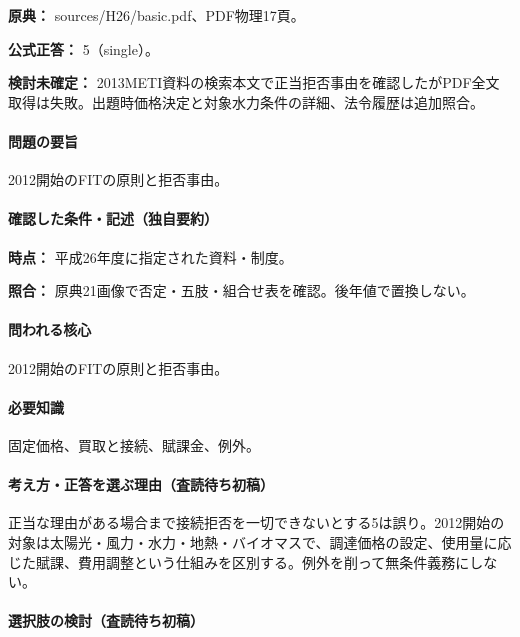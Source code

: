 \noindent\textbf{原典：} sources/H26/basic.pdf、PDF物理17頁。

\textbf{公式正答：} 5（single）。

\par\textbf{検討未確定：} 2013METI資料の検索本文で正当拒否事由を確認したがPDF全文取得は失敗。出題時価格決定と対象水力条件の詳細、法令履歴は追加照合。

\paragraph{問題の要旨} 2012開始のFITの原則と拒否事由。

\paragraph{確認した条件・記述（独自要約）}\mbox{}\par

\noindent\textbf{時点：} 平成26年度に指定された資料・制度。\par

\noindent\textbf{照合：} 原典21画像で否定・五肢・組合せ表を確認。後年値で置換しない。\par

\paragraph{問われる核心} 2012開始のFITの原則と拒否事由。

\paragraph{必要知識} 固定価格、買取と接続、賦課金、例外。

\paragraph{考え方・正答を選ぶ理由（査読待ち初稿）} 正当な理由がある場合まで接続拒否を一切できないとする5は誤り。2012開始の対象は太陽光・風力・水力・地熱・バイオマスで、調達価格の設定、使用量に応じた賦課、費用調整という仕組みを区別する。例外を削って無条件義務にしない。

\paragraph{選択肢の検討（査読待ち初稿）}\mbox{}\par

